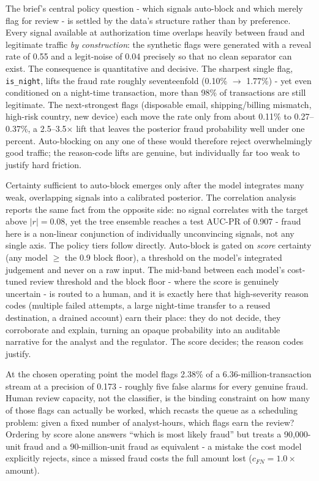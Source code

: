 \documentclass[11pt,a4paper]{report}
\newcommand{\code}[1]{\texttt{\small #1}}
\begin{document}
The brief's central policy question - which signals auto-block and which merely flag for review - is settled by the data's structure rather than by preference. Every signal available at authorization time overlaps heavily between fraud and legitimate traffic \emph{by construction}: the synthetic flags were generated with a reveal rate of 0.55 and a legit-noise of 0.04 precisely so that no clean separator can exist. The consequence is quantitative and decisive. The sharpest single flag, \code{is\_night}, lifts the fraud rate roughly seventeenfold (0.10\% $\to$ 1.77\%) - yet even conditioned on a night-time transaction, more than 98\% of transactions are still legitimate. The next-strongest flags (disposable email, shipping/billing mismatch, high-risk country, new device) each move the rate only from about 0.11\% to 0.27--0.37\%, a 2.5--3.5$\times$ lift that leaves the posterior fraud probability well under one percent. Auto-blocking on any one of these would therefore reject overwhelmingly good traffic; the reason-code lifts are genuine, but individually far too weak to justify hard friction.

Certainty sufficient to auto-block emerges only after the model integrates many weak, overlapping signals into a calibrated posterior. The correlation analysis reports the same fact from the opposite side: no signal correlates with the target above $|r|=0.08$, yet the tree ensemble reaches a test AUC-PR of 0.907 - fraud here is a non-linear conjunction of individually unconvincing signals, not any single axis. The policy tiers follow directly. Auto-block is gated on \emph{score} certainty (any model $\ge$ the 0.9 block floor), a threshold on the model's integrated judgement and never on a raw input. The mid-band between each model's cost-tuned review threshold and the block floor - where the score is genuinely uncertain - is routed to a human, and it is exactly here that high-severity reason codes (multiple failed attempts, a large night-time transfer to a reused destination, a drained account) earn their place: they do not decide, they corroborate and explain, turning an opaque probability into an auditable narrative for the analyst and the regulator. The score decides; the reason codes justify.

At the chosen operating point the model flags 2.38\% of a 6.36-million-transaction stream at a precision of 0.173 - roughly five false alarms for every genuine fraud. Human review capacity, not the classifier, is the binding constraint on how many of those flags can actually be worked, which recasts the queue as a scheduling problem: given a fixed number of analyst-hours, which flags earn the review? Ordering by score alone answers ``which is most likely fraud'' but treats a 90{,}000-unit fraud and a 90-million-unit fraud as equivalent - a mistake the cost model explicitly rejects, since a missed fraud costs the full amount lost ($c_{FN}=1.0\times$ amount).
\end{document}
